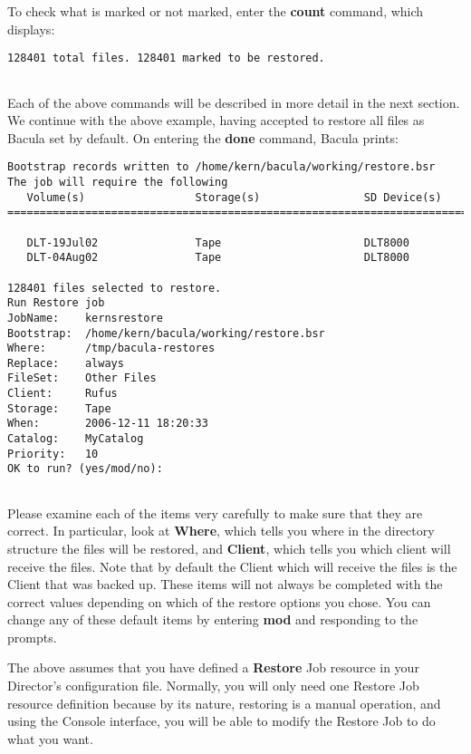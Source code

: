 To check what is marked or not marked, enter the {\bf count} command, which
displays:  

\footnotesize
\begin{verbatim}
128401 total files. 128401 marked to be restored.
     
\end{verbatim}
\normalsize

Each of the above commands will be described in more detail in the next
section. We continue with the above example, having accepted to restore all
files as Bacula set by default. On entering the {\bf done} command, Bacula
prints:  

\footnotesize
\begin{verbatim}
Bootstrap records written to /home/kern/bacula/working/restore.bsr
The job will require the following   
   Volume(s)                 Storage(s)                SD Device(s)
===========================================================================

   DLT-19Jul02               Tape                      DLT8000
   DLT-04Aug02               Tape                      DLT8000

128401 files selected to restore.
Run Restore job
JobName:    kernsrestore
Bootstrap:  /home/kern/bacula/working/restore.bsr
Where:      /tmp/bacula-restores
Replace:    always
FileSet:    Other Files
Client:     Rufus
Storage:    Tape
When:       2006-12-11 18:20:33
Catalog:    MyCatalog
Priority:   10
OK to run? (yes/mod/no):
    
\end{verbatim}
\normalsize

Please examine each of the items very carefully to make sure that they are
correct.  In particular, look at {\bf Where}, which tells you where in the
directory structure the files will be restored, and {\bf Client}, which
tells you which client will receive the files.  Note that by default the
Client which will receive the files is the Client that was backed up.
These items will not always be completed with the correct values depending
on which of the restore options you chose.  You can change any of these
default items by entering {\bf mod} and responding to the prompts.

The above assumes that you have defined a {\bf Restore} Job resource in your
Director's configuration file. Normally, you will only need one Restore Job
resource definition because by its nature, restoring is a manual operation,
and using the Console interface, you will be able to modify the Restore Job to
do what you want. 

